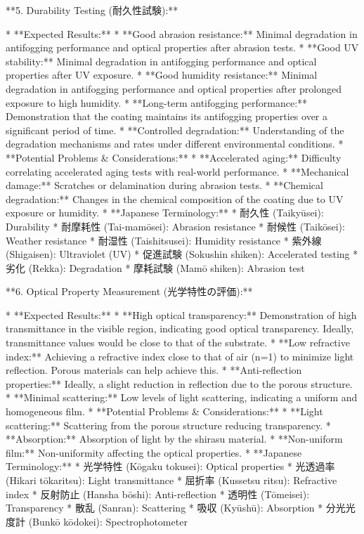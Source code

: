 \documentclass{article}
\begin{document}
**5. Durability Testing (耐久性試験):**

*   **Expected Results:**
    *   **Good abrasion resistance:**  Minimal degradation in antifogging performance and optical properties after abrasion tests.
    *   **Good UV stability:**  Minimal degradation in antifogging performance and optical properties after UV exposure.
    *   **Good humidity resistance:**  Minimal degradation in antifogging performance and optical properties after prolonged exposure to high humidity.
    *   **Long-term antifogging performance:**  Demonstration that the coating maintains its antifogging properties over a significant period of time.
    *   **Controlled degradation:** Understanding of the degradation mechanisms and rates under different environmental conditions.
*   **Potential Problems & Considerations:**
    *   **Accelerated aging:** Difficulty correlating accelerated aging tests with real-world performance.
    *   **Mechanical damage:**  Scratches or delamination during abrasion tests.
    *   **Chemical degradation:**  Changes in the chemical composition of the coating due to UV exposure or humidity.
*   **Japanese Terminology:**
    *   耐久性 (Taikyūsei): Durability
    *   耐摩耗性 (Tai-mamōsei): Abrasion resistance
    *   耐候性 (Taikōsei): Weather resistance
    *   耐湿性 (Taishitsusei): Humidity resistance
    *   紫外線 (Shigaisen): Ultraviolet (UV)
    *   促進試験 (Sokushin shiken): Accelerated testing
    *   劣化 (Rekka): Degradation
    *   摩耗試験 (Mamō shiken): Abrasion test

**6. Optical Property Measurement (光学特性の評価):**

*   **Expected Results:**
    *   **High optical transparency:**  Demonstration of high transmittance in the visible region, indicating good optical transparency.  Ideally, transmittance values would be close to that of the substrate.
    *   **Low refractive index:** Achieving a refractive index close to that of air (n=1) to minimize light reflection. Porous materials can help achieve this.
    *   **Anti-reflection properties:** Ideally, a slight reduction in reflection due to the porous structure.
    *   **Minimal scattering:**  Low levels of light scattering, indicating a uniform and homogeneous film.
*   **Potential Problems & Considerations:**
    *   **Light scattering:** Scattering from the porous structure reducing transparency.
    *   **Absorption:** Absorption of light by the shirasu material.
    *   **Non-uniform film:** Non-uniformity affecting the optical properties.
*   **Japanese Terminology:**
    *   光学特性 (Kōgaku tokusei): Optical properties
    *   光透過率 (Hikari tōkaritsu): Light transmittance
    *   屈折率 (Kussetsu ritsu): Refractive index
    *   反射防止 (Hansha bōshi): Anti-reflection
    *   透明性 (Tōmeisei): Transparency
    *   散乱 (Sanran): Scattering
    *   吸収 (Kyūshū): Absorption
    *   分光光度計 (Bunkō kōdokei): Spectrophotometer
\end{document}
